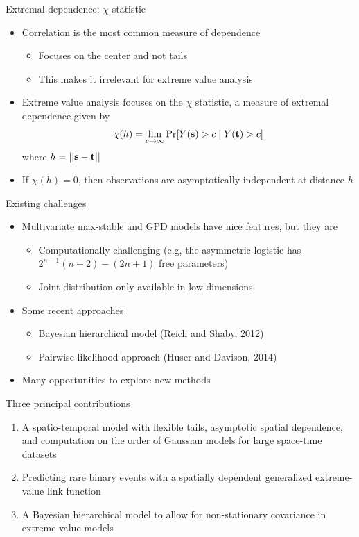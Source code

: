 \documentclass{beamer}
\begin{document}
\begin{frame}{Extremal dependence: $\chi$ statistic}
  \begin{itemize} \setlength{\itemsep}{1em}
    \item Correlation is the most common measure of dependence
    \begin{itemize}
      \item Focuses on the center and not tails
      \item This makes it irrelevant for extreme value analysis
    \end{itemize}
    \item Extreme value analysis focuses on the $\chi$ statistic, a measure of extremal dependence given by
    \begin{align*}
      \chi(h) = \lim_{c \rightarrow \infty}\Pr[Y(\mbox{\bf s}) > c \mid Y(\mbox{\bf t}) > c]
    \end{align*}
    where $h = ||\mbox{\bf s} - \mbox{\bf t}||$
    \item If $ \chi(h) = 0$, then observations are asymptotically independent at distance $h$
  \end{itemize}
\end{frame}

\begin{frame}{Existing challenges}
  \begin{itemize} \setlength{\itemsep}{1em}
    \item Multivariate max-stable and GPD models have nice features, but they are
    \begin{itemize}
      \item Computationally challenging (e.g,  the asymmetric logistic has $2^{n-1}(n + 2) - (2n + 1)$ free parameters)
      \item Joint distribution only available in low dimensions
    \end{itemize}
    \item Some recent approaches
    \begin{itemize}
      \item Bayesian hierarchical model (Reich and Shaby, 2012)
      \item Pairwise likelihood approach (Huser and Davison, 2014)
    \end{itemize}
    \item Many opportunities to explore new methods
  \end{itemize}
\end{frame}

\begin{frame}{Three principal contributions}
  \begin{enumerate}[1] \setlength{\itemsep}{1em}
    \item A spatio-temporal model with flexible tails, asymptotic spatial dependence, and computation on the order of Gaussian models for large space-time datasets
    \item Predicting rare binary events with a spatially dependent generalized extreme-value link function
    \item A Bayesian hierarchical model to allow for non-stationary covariance in extreme value models
  \end{enumerate}
\end{frame}
\end{document}
